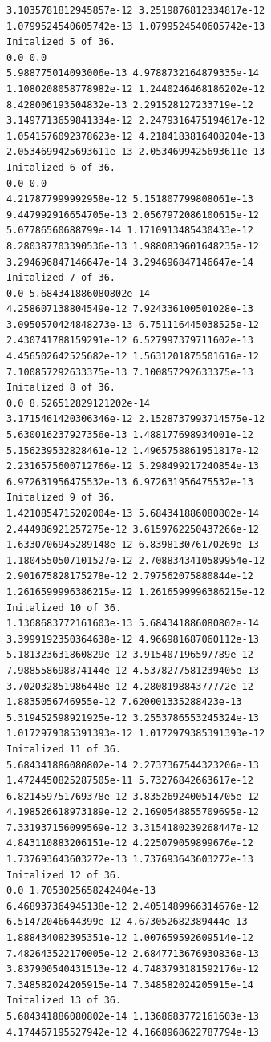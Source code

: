 \documentclass[11pt]{article}
\begin{document}
\begin{Verbatim}[commandchars=\\\{\}]
3.1035781812945857e-12 3.2519876812334817e-12
1.0799524540605742e-13 1.0799524540605742e-13
Initalized 5 of 36.
0.0 0.0
5.988775014093006e-13 4.9788732164879335e-14
1.1080208058778982e-12 1.2440246468186202e-12
8.428006193504832e-13 2.291528127233719e-12
3.1497713659841334e-12 2.2479316475194617e-12
1.0541576092378623e-12 4.2184183816408204e-13
2.0534699425693611e-13 2.0534699425693611e-13
Initalized 6 of 36.
0.0 0.0
4.217877999992958e-12 5.151807799808061e-13
9.447992916654705e-13 2.0567972086100615e-12
5.07786560688799e-14 1.1710913485430433e-12
8.280387703390536e-13 1.9880839601648235e-12
3.294696847146647e-14 3.294696847146647e-14
Initalized 7 of 36.
0.0 5.684341886080802e-14
4.258607138804549e-12 7.924336100501028e-13
3.0950570424848273e-13 6.751116445038525e-12
2.430741788159291e-12 6.527997379711602e-13
4.456502642525682e-12 1.5631201875501616e-12
7.100857292633375e-13 7.100857292633375e-13
Initalized 8 of 36.
0.0 8.526512829121202e-14
3.1715461420306346e-12 2.1528737993714575e-12
5.630016237927356e-13 1.488177698934001e-12
5.156239532828461e-12 1.4965758861951817e-12
2.2316575600712766e-12 5.298499217240854e-13
6.972631956475532e-13 6.972631956475532e-13
Initalized 9 of 36.
1.4210854715202004e-13 5.684341886080802e-14
2.444986921257275e-12 3.6159762250437266e-12
1.6330706945289148e-12 6.839813076170269e-13
1.1804550507101527e-12 2.7088343410589954e-12
2.901675828175278e-12 2.797562075880844e-12
1.2616599996386215e-12 1.2616599996386215e-12
Initalized 10 of 36.
1.1368683772161603e-13 5.684341886080802e-14
3.3999192350364638e-12 4.966981687060112e-13
5.181323631860829e-12 3.915407196597789e-12
7.988558698874144e-12 4.5378277581239405e-13
3.702032851986448e-12 4.280819884377772e-12
1.8835056746955e-12 7.620001335288423e-13
5.319452598921925e-12 3.2553786553245324e-13
1.0172979385391393e-12 1.0172979385391393e-12
Initalized 11 of 36.
5.684341886080802e-14 2.2737367544323206e-13
1.4724450825287505e-11 5.73276842663617e-12
6.821459751769378e-12 3.8352692400514705e-12
4.198526618973189e-12 2.1690548855709695e-12
7.331937156099569e-12 3.3154180239268447e-12
4.843110883206151e-12 4.225079059899676e-12
1.737693643603272e-13 1.737693643603272e-13
Initalized 12 of 36.
0.0 1.7053025658242404e-13
6.468937364945138e-12 2.4051489966314676e-12
6.51472046644399e-12 4.673052682389444e-13
1.888434082395351e-12 1.007659592609514e-12
7.482643522170005e-12 2.6847713676930836e-13
3.837900540431513e-12 4.7483793181592176e-12
7.348582024205915e-14 7.348582024205915e-14
Initalized 13 of 36.
5.684341886080802e-14 1.1368683772161603e-13
4.174467195527942e-12 4.1668968622787794e-13

\end{Verbatim}
\end{document}
